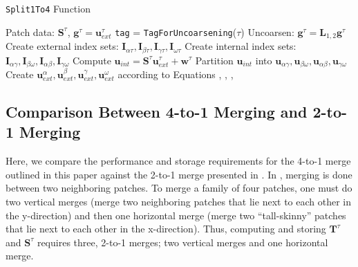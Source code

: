\begin{algorithm}[H]
    \caption{\texttt{Split1To4} Function}
    \begin{algorithmic}[0]
        \Require Patch data: $\textbf{S}^{\tau}$, $\textbf{g}^{\tau} = \textbf{u}^{\tau}_{ext}$
        \State \texttt{tag} = \texttt{TagForUncoarsening}($\tau$) 
            \State Uncoarsen: $\textbf{g}^{\tau} = \textbf{L}_{1,2} \textbf{g}^{\tau}$ 
        \EndIf
        \State Create external index sets: $\textbf{I}_{\alpha \tau}, \textbf{I}_{\beta \tau}, \textbf{I}_{\gamma \tau}, \textbf{I}_{\omega \tau}$ 
        \State Create internal index sets: $\textbf{I}_{\alpha \gamma}, \textbf{I}_{\beta \omega}, \textbf{I}_{\alpha \beta}, \textbf{I}_{\gamma \omega}$ 
        \State Compute $\textbf{u}_{int} = \textbf{S}^{\tau} \textbf{u}^{\tau}_{ext} + \textbf{w}^{\tau}$ 
        \State Partition $\textbf{u}_{int}$ into $\textbf{u}_{\alpha \gamma}, \textbf{u}_{\beta \omega}, \textbf{u}_{\alpha \beta}, \textbf{u}_{\gamma \omega}$
        \State {}
        \State Create $\textbf{u}^{\alpha}_{ext}, \textbf{u}^{\beta}_{ext}, \textbf{u}^{\gamma}_{ext}, \textbf{u}^{\omega}_{ext}$ according to Equations , , , 
    \end{algorithmic}
    \label{alg:solve_split}
\end{algorithm}

\subsection{Comparison Between 4-to-1 Merging and 2-to-1 Merging}
\label{sub:comparison_between_4t1_and2t1_merging}

Here, we compare the performance and storage requirements for the 4-to-1 merge outlined in this paper against the 2-to-1 merge presented in \citep{gillman2014direct}. In \citep{gillman2014direct}, merging is done between two neighboring patches. To merge a family of four patches, one must do two vertical merges (merge two neighboring patches that lie next to each other in the y-direction) and then one horizontal merge (merge two ``tall-skinny'' patches that lie next to each other in the x-direction). Thus, computing and storing $\textbf{T}^{\tau}$ and $\textbf{S}^{\tau}$ requires three, 2-to-1 merges; two vertical merges and one horizontal merge.

